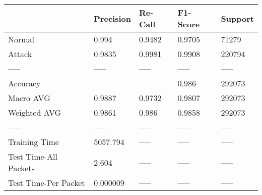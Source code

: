 \begin{tabular}{lllll}
\toprule
{} & Precision & Re-Call & F1-Score & Support \\
\midrule
Normal                &     0.994 &  0.9482 &   0.9705 &   71279 \\
Attack                &    0.9835 &  0.9981 &   0.9908 &  220794 \\
-----                 &     ----- &   ----- &    ----- &   ----- \\
Accuracy              &           &         &    0.986 &  292073 \\
Macro AVG             &    0.9887 &  0.9732 &   0.9807 &  292073 \\
Weighted AVG          &    0.9861 &   0.986 &   0.9858 &  292073 \\
-----                 &     ----- &   ----- &    ----- &   ----- \\
Training Time         &  5057.794 &   ----- &    ----- &   ----- \\
Test Time-All Packets &     2.604 &   ----- &    ----- &   ----- \\
Test Time-Per Packet  &  0.000009 &   ----- &    ----- &   ----- \\
\bottomrule
\end{tabular}
